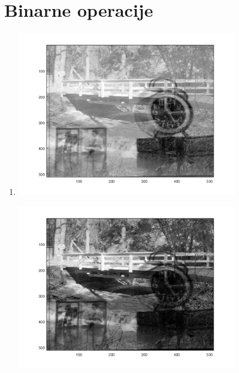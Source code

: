 \documentclass[12pt, a4]{report}
\begin{document}
        \section{Binarne operacije}
            \begin{enumerate}
                \item
                    \begin{minipage}{\linewidth}
                        \centering
                        \includegraphics[width=0.75\textwidth]{binarysum}
                    \end{minipage}
                    \begin{minipage}{\linewidth}
                        \centering
                        \includegraphics[width=0.75\textwidth]{binarymul}
                    \end{minipage}
                    \begin{minipage}{\linewidth}
                        \centering

\end{minipage}
\end{enumerate}
\end{document}
